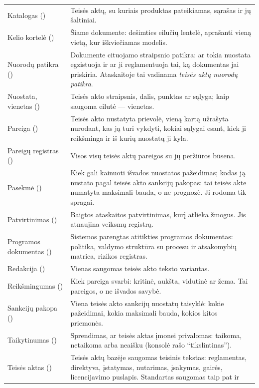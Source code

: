 \begin{xltabular}{\textwidth}{@{}L{36mm}Y@{}}
Katalogas () & Teisės aktų, su kuriais produktas pateikiamas, sąrašas ir jų
  šaltiniai. \\
Kelio kortelė () & Šiame dokumente: dešimties eilučių lentelė, aprašanti vieną
  vietą, kur iškviečiamas modelis. \\
Nuorodų patikra () & Dokumente cituojamo straipsnio patikra: ar tokia
  nuostata egzistuoja ir ar ji reglamentuoja tai, ką dokumentas jai priskiria. Ataskaitoje tai
  vadinama \emph{teisės aktų nuorodų patikra}. \\
Nuostata, vienetas () & Teisės akto straipsnis, dalis, punktas ar sąlyga;
  kaip saugoma eilutė --- vienetas. \\
Pareiga () & Teisės akto nustatyta prievolė, vieną kartą užrašyta nurodant, kas ją
  turi vykdyti, kokiai sąlygai esant, kiek ji reikšminga ir iš kurių nuostatų ji kyla. \\
Pareigų registras () & Visos visų teisės aktų pareigos su jų
  peržiūros būsena. \\
Pasekmė () & Kiek gali kainuoti išvados nuostatos pažeidimas; kodas ją
  nustato pagal teisės akto sankcijų pakopas: tai teisės akte numatyta maksimali bauda, o ne
  prognozė. Ji rodoma tik spragai. \\
Patvirtinimas () & Baigtos ataskaitos patvirtinimas, kurį atlieka žmogus. Jis
  atnaujina veiksmų registrą. \\
Programos dokumentas () & Sistemos parengtas atitikties programos dokumentas:
  politika, valdymo struktūra su procesu ir atsakomybių matrica, rizikos registras. \\
Redakcija () & Vienas saugomas teisės akto teksto variantas. \\
Reikšmingumas () & Kiek pareiga svarbi: kritinė, aukšta, vidutinė ar žema. Tai
  pareigos, o ne išvados savybė. \\
Sankcijų pakopa () & Viena teisės akto sankcijų nuostatų taisyklė:
  kokie pažeidimai, kokia maksimali bauda, kokios kitos priemonės. \\
Taikytinumas () & Sprendimas, ar teisės aktas įmonei privalomas: taikoma,
  netaikoma arba neaišku (konsolė rašo \enquote{tikslintinas}). \\
Teisės aktas () & Teisės aktų bazėje saugomas teisinis tekstas: reglamentas, direktyva, įstatymas,
  nutarimas, įsakymas, gairės, licencijavimo puslapis. Standartas saugomas taip pat ir

\end{xltabular}

